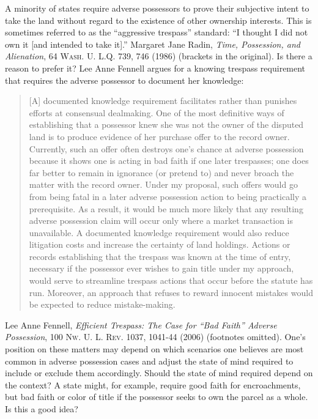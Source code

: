 \item A minority of states require adverse
possessors
to prove their subjective intent to take the land without regard to the
existence of other ownership interests. This is sometimes referred to as the
``aggressive trespass'' standard: ``I thought I did not own it [and intended to
take it].'' Margaret Jane Radin, \textit{Time, Possession, and Alienation}, 64
\textsc{Wash. U. L.Q.} 739, 746 (1986) (brackets in the original). Is there a
reason to prefer it? Lee Anne Fennell argues for a knowing trespass requirement
that requires the adverse possessor to document her knowledge:
\begin{quote}
[A] documented knowledge requirement facilitates rather than punishes efforts at
consensual dealmaking. One of the most definitive ways of establishing that a
possessor knew she was not the owner of the disputed land is to produce
evidence of her purchase offer to the record owner. Currently, such an offer
often destroys one's chance at adverse possession because it shows one is
acting in bad faith if one later trespasses; one does far better to remain in
ignorance (or pretend to) and never broach the matter with the record owner.
Under my proposal, such offers would go from being fatal in a later adverse
possession action to being practically a prerequisite. As a result, it would be
much more likely that any resulting adverse possession claim will occur only
where a market transaction is unavailable. A documented knowledge requirement
would also reduce litigation costs and increase the certainty of land holdings.
Actions or records establishing that the trespass was known at the time of
entry, necessary if the possessor ever wishes to gain title under my approach,
would serve to streamline trespass actions that occur before the statute has
run. Moreover, an approach that refuses to reward innocent mistakes would be
expected to reduce mistake-making.
\end{quote}
Lee Anne Fennell, \textit{Efficient Trespass: The Case for ``Bad Faith'' Adverse
Possession}, 100 \textsc{Nw. U. L. Rev}. 1037, 1041-44 (2006) (footnotes
omitted). One's position on these matters may depend on which scenarios one
believes are most common in adverse possession cases and adjust the state of
mind required to include or exclude them accordingly. Should the state of mind
required depend on the context? A state might, for example, require good faith
for encroachments, but bad faith or color of title if the possessor seeks to
own the parcel as a whole. Is this a good idea? 

